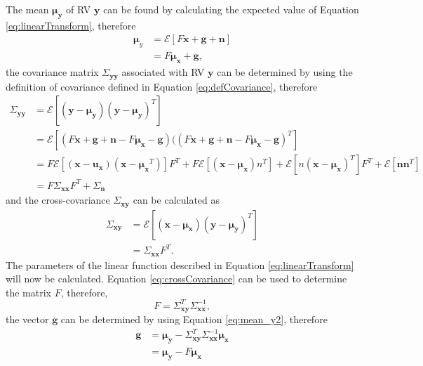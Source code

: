 \documentclass[12pt,oneside,openany,a4paper, %
afrikaans,english,
]{memoir}
\numberwithin{equation}{chapter}
\begin{document}
The mean $\bm{\mu_y}$ of RV $\bm{y}$ can be found by calculating the expected value of Equation \ref{eq:linearTransform}, therefore
\begin{equation}\label{eq:mean_y2}
\begin{split}
\bm{\mu}_y & = \mathcal{E}[F\bm{x} + \bm{g} + \bm{n}]\\
& = F\bm{\mu_x} + \bm{g},
\end{split}
\end{equation}
the covariance matrix $\Sigma_{\bm{yy}}$ associated with RV $\bm{y}$ can be determined by using the definition of covariance defined in Equation \ref{eq:defCovariance}, therefore
\begin{equation}
\begin{split}
\Sigma_{\bm{yy}} & = \mathcal{E}\left[(\bm{y} - \bm{\mu_y})(\bm{y} - \bm{\mu_y})^T\right]\\
& = \mathcal{E}\left[(F\bm{x} + \bm{g} + \bm{n} - F\bm{\mu_x} - \bm{g})((F\bm{x} + \bm{g} + \bm{n} - F\bm{\mu_x} - \bm{g})^T\right]\\
& = F\mathcal{E}\left[(\bm{x} - \bm{u_x})(\bm{x} - \bm{\mu_x}^T)\right]F^T + F\mathcal{E}\left[(\bm{x} - \bm{\mu_x})n^T\right] + \mathcal{E}\left[n(\bm{x} - \bm{\mu_x})^T\right]F^T + \mathcal{E}\left[\bm{nn}^T\right]\\
& = F \Sigma_{\bm{xx}} F^T + \Sigma_{\bm{n}}
\end{split}
\end{equation}
and the cross-covariance $\Sigma_{\bm{xy}}$ can be calculated as
\begin{equation}\label{eq:crossCovariance}
\begin{split}
\Sigma_{\bm{xy}} & = \mathcal{E}\left[(\bm{x} - \bm{\mu_x})(\bm{y} - \bm{\mu}_{\bm{y}})^T\right]\\
& = \Sigma_{\bm{xx}}F^T.
\end{split}
\end{equation}
The parameters of the linear function described in Equation \ref{eq:linearTransform} will now be calculated. Equation \ref{eq:crossCovariance} can be used to determine the matrix $F$, therefore,
\begin{equation}
F = \Sigma_{\bm{xy}}^T\Sigma_{\bm{xx}}^{-1},
\end{equation}\label{eq:detF}
the vector $\bm{g}$ can be determined by using Equation \ref{eq:mean_y2}, therefore
\begin{equation}\label{eq:detg}
\begin{split}
\bm{g} & = \bm{\mu_y} - \Sigma_{\bm{xy}}^T \Sigma_{\bm{xx}}^{-1} \bm{\mu_x}\\
& = \bm{\mu_y} - F\bm{\mu_x}
\end{split}
\end{equation}
\end{document}
